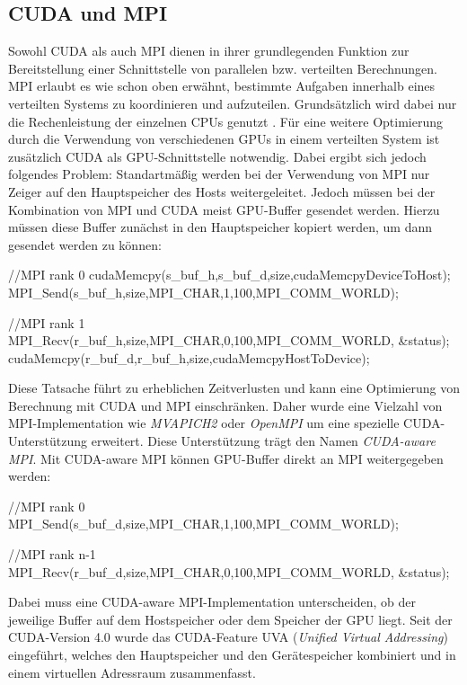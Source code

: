 \documentclass[doktyp=semarbeit, sprache=german]{TUBAFarbeiten}
\begin{document}
\subsection{CUDA und MPI}
Sowohl CUDA als auch MPI dienen in ihrer grundlegenden Funktion zur Bereitstellung einer Schnittstelle von parallelen bzw. verteilten Berechnungen. MPI erlaubt es wie schon oben erwähnt, bestimmte Aufgaben innerhalb eines verteilten Systems zu koordinieren und aufzuteilen. Grundsätzlich wird dabei nur die Rechenleistung der einzelnen CPUs genutzt \cite{CUDAAwareMPI}.
Für eine weitere Optimierung durch die Verwendung von verschiedenen GPUs in einem verteilten System ist zusätzlich CUDA als GPU-Schnittstelle notwendig.
Dabei ergibt sich jedoch folgendes Problem: Standartmäßig werden bei der Verwendung von MPI nur Zeiger auf den Hauptspeicher des Hosts weitergeleitet. Jedoch müssen bei der Kombination von MPI und CUDA meist GPU-Buffer gesendet werden. Hierzu müssen diese Buffer zunächst in den Hauptspeicher kopiert werden, um dann gesendet werden zu können:
\begin{CPP}
//MPI rank 0
cudaMemcpy(s_buf_h,s_buf_d,size,cudaMemcpyDeviceToHost);
MPI_Send(s_buf_h,size,MPI_CHAR,1,100,MPI_COMM_WORLD);

//MPI rank 1
MPI_Recv(r_buf_h,size,MPI_CHAR,0,100,MPI_COMM_WORLD, &status);
cudaMemcpy(r_buf_d,r_buf_h,size,cudaMemcpyHostToDevice);
\end{CPP}
Diese Tatsache führt zu erheblichen Zeitverlusten und kann eine Optimierung von Berechnung mit CUDA und MPI einschränken. Daher wurde eine Vielzahl von MPI-Implementation wie \textit{MVAPICH2} oder \textit{OpenMPI} um eine spezielle CUDA-Unterstützung erweitert. Diese Unterstützung trägt den Namen \textit{CUDA-aware MPI}. Mit CUDA-aware MPI können GPU-Buffer direkt an MPI weitergegeben werden:
\begin{CPP}
//MPI rank 0
MPI_Send(s_buf_d,size,MPI_CHAR,1,100,MPI_COMM_WORLD);

//MPI rank n-1
MPI_Recv(r_buf_d,size,MPI_CHAR,0,100,MPI_COMM_WORLD, &status);
\end{CPP}
Dabei muss eine CUDA-aware MPI-Implementation unterscheiden, ob der jeweilige Buffer auf dem Hostspeicher oder dem Speicher der GPU liegt. Seit der CUDA-Version 4.0 wurde das CUDA-Feature UVA (\textit{Unified Virtual Addressing}) eingeführt, welches den Hauptspeicher und den Gerätespeicher kombiniert und in einem virtuellen Adressraum zusammenfasst.
\end{document}
